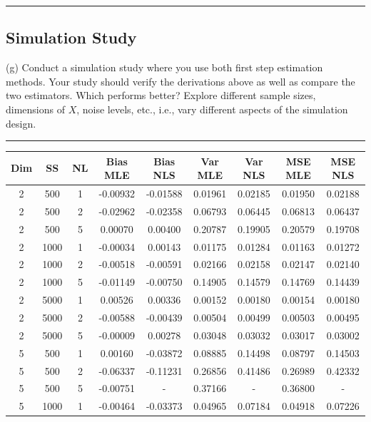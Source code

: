 \documentclass{article}
\newenvironment{colorparagraph}[1]{\par\color{#1}}{\par}
\begin{document}
\begin{colorparagraph}{questioncolor}
  \label{q1g}
  \rule{\textwidth}{0.5pt}
  \subsection{Simulation Study}
  (g) Conduct a simulation study where you use both first step estimation methods.
  Your study should verify the derivations above as well as compare the two estimators.
  Which performs better?
  Explore different sample sizes, dimensions of \( X \), noise levels, etc., i.e., vary different aspects of the simulation design.
  
  \rule{\textwidth}{0.5pt}
  \end{colorparagraph}
  

  \begin{table}[H]
    \centering
  \begin{tabular}{|ccc|cccccc|}
    \hline
      Dim & SS & NL & Bias MLE & Bias NLS & Var MLE & Var NLS & MSE MLE & MSE NLS \\
      \hline
      2 & 500 & 1 & -0.00932 & -0.01588 & 0.01961 & 0.02185 & 0.01950 & 0.02188 \\
      2 & 500 & 2 & -0.02962 & -0.02358 & 0.06793 & 0.06445 & 0.06813 & 0.06437 \\
      2 & 500 & 5 & 0.00070 & 0.00400 & 0.20787 & 0.19905 & 0.20579 & 0.19708 \\
      2 & 1000 & 1 & -0.00034 & 0.00143 & 0.01175 & 0.01284 & 0.01163 & 0.01272 \\
      2 & 1000 & 2 & -0.00518 & -0.00591 & 0.02166 & 0.02158 & 0.02147 & 0.02140 \\
      2 & 1000 & 5 & -0.01149 & -0.00750 & 0.14905 & 0.14579 & 0.14769 & 0.14439 \\
      2 & 5000 & 1 & 0.00526 & 0.00336 & 0.00152 & 0.00180 & 0.00154 & 0.00180 \\
      2 & 5000 & 2 & -0.00588 & -0.00439 & 0.00504 & 0.00499 & 0.00503 & 0.00495 \\
      2 & 5000 & 5 & -0.00009 & 0.00278 & 0.03048 & 0.03032 & 0.03017 & 0.03002 \\
      5 & 500 & 1 & 0.00160 & -0.03872 & 0.08885 & 0.14498 & 0.08797 & 0.14503 \\
      5 & 500 & 2 & -0.06337 & -0.11231 & 0.26856 & 0.41486 & 0.26989 & 0.42332 \\
      5 & 500 & 5 & -0.00751 & - & 0.37166 & - & 0.36800 & - \\
      5 & 1000 & 1 & -0.00464 & -0.03373 & 0.04965 & 0.07184 & 0.04918 & 0.07226 \\

\end{tabular}
\end{table}
\end{document}
